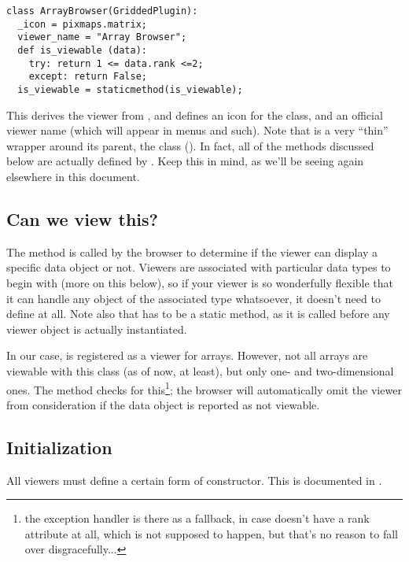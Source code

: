 \documentclass[12pt,twoside]{book}
\begin{document}
\begin{verbatim}  
class ArrayBrowser(GriddedPlugin):
  _icon = pixmaps.matrix;
  viewer_name = "Array Browser";
  def is_viewable (data):
    try: return 1 <= data.rank <=2;
    except: return False;
  is_viewable = staticmethod(is_viewable);
\end{verbatim}

  This derives the viewer from , and defines an icon for the
  class, and an official viewer name (which will appear in menus and such). Note
  that  is a very ``thin'' wrapper around its parent, the
   class (). In fact, all of the
  methods discussed below are actually defined by . Keep this in
  mind, as we'll be seeing  again elsewhere in this document.
  
\subsection{Can we view this?} 

  The  method is called by the browser to determine if the
  viewer can display a specific data object or not. Viewers are associated with
  particular data types to begin with (more on this below), so if your viewer is
  so wonderfully flexible that it can handle any object of the associated
  type whatsoever, it doesn't need to define  at all. Note
  also that  has to be a static method, as it is called
  before any viewer object is actually instantiated.

  In our case,  is registered as a viewer for arrays. However,
  not all arrays are viewable with this class (as of now, at least), but only
  one- and two-dimensional ones. The  method checks for
  this\footnote{the exception handler is there as a fallback, in case 
  doesn't have a rank attribute at all, which is not supposed to happen, but
  that's no reason to fall over disgracefully...}; the browser will
  automatically omit the viewer from consideration if the data object is
  reported as not viewable. 

\subsection{Initialization} 

  All viewers must define a certain form of constructor. This is documented in
  .
\end{document}
